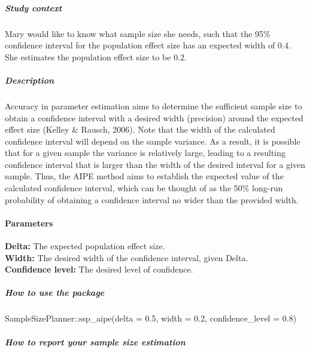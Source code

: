 \documentclass[
  english,
  man,floatsintext]{apa6}
\newenvironment{Shaded}{\begin{snugshade}}{\end{snugshade}}
\newcommand{\AttributeTok}[1]{\textcolor[rgb]{0.77,0.63,0.00}{#1}}
\newcommand{\FloatTok}[1]{\textcolor[rgb]{0.00,0.00,0.81}{#1}}
\newcommand{\FunctionTok}[1]{\textcolor[rgb]{0.00,0.00,0.00}{#1}}
\newcommand{\NormalTok}[1]{#1}
\newcommand{\SpecialCharTok}[1]{\textcolor[rgb]{0.00,0.00,0.00}{#1}}
\let\oldparagraph\paragraph
\renewcommand{\paragraph}[1]{\oldparagraph{#1}\mbox{}}
\let\oldsubparagraph\subparagraph
\renewcommand{\subparagraph}[1]{\oldsubparagraph{#1}\mbox{}}
\begin{document}
\hypertarget{study-context-6}{%
\subparagraph{Study context}\label{study-context-6}}

Mary would like to know what sample size she needs, such that the 95\% confidence interval for the population effect size has an expected width of 0.4. She estimates the population effect size to be 0.2.

\hypertarget{description-6}{%
\subparagraph{Description}\label{description-6}}

Accuracy in parameter estimation aims to determine the sufficient sample size to obtain a confidence interval with a desired width (precision) around the expected effect size (Kelley \& Rausch, 2006). Note that the width of the calculated confidence interval will depend on the sample variance. As a result, it is possible that for a given sample the variance is relatively large, leading to a resulting confidence interval that is larger than the width of the desired interval for a given sample. Thus, the AIPE method aims to establish the expected value of the calculated confidence interval, which can be thought of as the 50\% long-run probability of obtaining a confidence interval no wider than the provided width.

\hypertarget{parameters-6}{%
\paragraph{Parameters}\label{parameters-6}}

\textbf{Delta:} The expected population effect size.\\
\textbf{Width:} The desired width of the confidence interval, given Delta.\\
\textbf{Confidence level:} The desired level of confidence.\\

\hypertarget{how-to-use-the-package-6}{%
\subparagraph{How to use the package}\label{how-to-use-the-package-6}}

\begin{Shaded}
\begin{Highlighting}[]
\NormalTok{SampleSizePlanner}\SpecialCharTok{::}\FunctionTok{ssp\_aipe}\NormalTok{(}\AttributeTok{delta =} \FloatTok{0.5}\NormalTok{, }\AttributeTok{width =} \FloatTok{0.2}\NormalTok{, }\AttributeTok{confidence\_level =} \FloatTok{0.8}\NormalTok{)}
\end{Highlighting}
\end{Shaded}

\hypertarget{how-to-report-your-sample-size-estimation-6}{%
\subparagraph{How to report your sample size estimation}\label{how-to-report-your-sample-size-estimation-6}}
\end{document}
